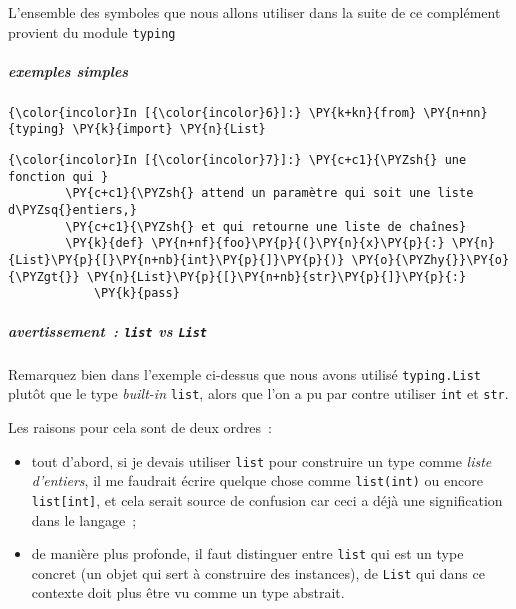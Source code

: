     L'ensemble des symboles que nous allons utiliser dans la suite de ce
complément provient du module \texttt{typing}

    \hypertarget{exemples-simples}{%
\subparagraph{exemples simples}\label{exemples-simples}}

    \begin{Verbatim}[commandchars=\\\{\},frame=single,framerule=0.3mm,rulecolor=\color{cellframecolor}]
{\color{incolor}In [{\color{incolor}6}]:} \PY{k+kn}{from} \PY{n+nn}{typing} \PY{k}{import} \PY{n}{List}
\end{Verbatim}


    \begin{Verbatim}[commandchars=\\\{\},frame=single,framerule=0.3mm,rulecolor=\color{cellframecolor}]
{\color{incolor}In [{\color{incolor}7}]:} \PY{c+c1}{\PYZsh{} une fonction qui }
        \PY{c+c1}{\PYZsh{} attend un paramètre qui soit une liste d\PYZsq{}entiers,}
        \PY{c+c1}{\PYZsh{} et qui retourne une liste de chaînes}
        \PY{k}{def} \PY{n+nf}{foo}\PY{p}{(}\PY{n}{x}\PY{p}{:} \PY{n}{List}\PY{p}{[}\PY{n+nb}{int}\PY{p}{]}\PY{p}{)} \PY{o}{\PYZhy{}}\PY{o}{\PYZgt{}} \PY{n}{List}\PY{p}{[}\PY{n+nb}{str}\PY{p}{]}\PY{p}{:}
            \PY{k}{pass}
\end{Verbatim}


    \hypertarget{avertissement-list-vs-list}{%
\subparagraph{\texorpdfstring{avertissement~: \texttt{list} vs
\texttt{List}}{avertissement~: list vs List}}\label{avertissement-list-vs-list}}

    Remarquez bien dans l'exemple ci-dessus que nous avons utilisé
\texttt{typing.List} plutôt que le type \emph{built-in} \texttt{list},
alors que l'on a pu par contre utiliser \texttt{int} et \texttt{str}.

Les raisons pour cela sont de deux ordres~:

\begin{itemize}
\item
  tout d'abord, si je devais utiliser \texttt{list} pour construire un
  type comme \emph{liste d'entiers}, il me faudrait écrire quelque chose
  comme \texttt{list(int)} ou encore \texttt{list{[}int{]}}, et cela
  serait source de confusion car ceci a déjà une signification dans le
  langage~;
\item
  de manière plus profonde, il faut distinguer entre \texttt{list} qui
  est un type concret (un objet qui sert à construire des instances), de
  \texttt{List} qui dans ce contexte doit plus être vu comme un type
  abstrait.
\end{itemize}

